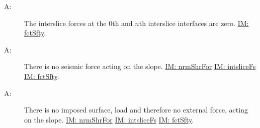 \documentclass[12pt]{article}
\newcounter{assumpnum}
\newcommand{\atheassumpnum}{A\theassumpnum}
\begin{document}
\begin{description}
\item[\atheassumpnum\label{A:Edge-Slices}:]The interslice forces at the 0th and $n$th interslice interfaces are zero. \hyperref[IM:fctSfty]{IM: fctSfty}.
\end{description}
\begin{description}
\item[\atheassumpnum\label{A:Seismic-Force}:]There is no seismic force acting on the slope. \hyperref[IM:nrmShrFor]{IM: nrmShrFor} \hyperref[IM:intsliceFs]{IM: intsliceFs} \hyperref[IM:fctSfty]{IM: fctSfty}.
\end{description}
\begin{description}
\item[\atheassumpnum\label{A:Surface-Load}:]There is no imposed surface, load and therefore no external force, acting on the slope. \hyperref[IM:nrmShrFor]{IM: nrmShrFor} \hyperref[IM:intsliceFs]{IM: intsliceFs} \hyperref[IM:fctSfty]{IM: fctSfty}.
\end{description}
\end{document}
